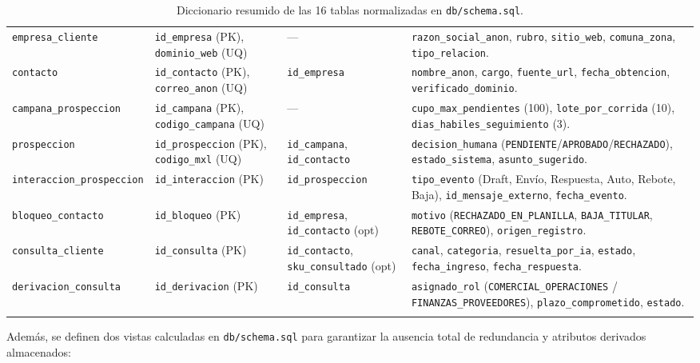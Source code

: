 \documentclass{article}
\begin{document}
\begin{longtable}{p{3.4cm}p{2.9cm}p{4.1cm}p{4.6cm}}
\texttt{empresa\_cliente} & \texttt{id\_empresa} (PK), \texttt{dominio\_web} (UQ) & --- & \texttt{razon\_social\_anon}, \texttt{rubro}, \texttt{sitio\_web}, \texttt{comuna\_zona}, \texttt{tipo\_relacion}. \\
\texttt{contacto} & \texttt{id\_contacto} (PK), \texttt{correo\_anon} (UQ) & \texttt{id\_empresa} & \texttt{nombre\_anon}, \texttt{cargo}, \texttt{fuente\_url}, \texttt{fecha\_obtencion}, \texttt{verificado\_dominio}. \\
\texttt{campana\_prospeccion} & \texttt{id\_campana} (PK), \texttt{codigo\_campana} (UQ) & --- & \texttt{cupo\_max\_pendientes} (100), \texttt{lote\_por\_corrida} (10), \texttt{dias\_habiles\_seguimiento} (3). \\
\texttt{prospeccion} & \texttt{id\_prospeccion} (PK), \texttt{codigo\_mxl} (UQ) & \texttt{id\_campana}, \texttt{id\_contacto} & \texttt{decision\_humana} (\texttt{PENDIENTE}/\texttt{APROBADO}/\texttt{RECHAZADO}), \texttt{estado\_sistema}, \texttt{asunto\_sugerido}. \\
\texttt{interaccion\_prospeccion} & \texttt{id\_interaccion} (PK) & \texttt{id\_prospeccion} & \texttt{tipo\_evento} (Draft, Envío, Respuesta, Auto, Rebote, Baja), \texttt{id\_mensaje\_externo}, \texttt{fecha\_evento}. \\
\texttt{bloqueo\_contacto} & \texttt{id\_bloqueo} (PK) & \texttt{id\_empresa}, \texttt{id\_contacto} (opt) & \texttt{motivo} (\texttt{RECHAZADO\_EN\_PLANILLA}, \texttt{BAJA\_TITULAR}, \texttt{REBOTE\_CORREO}), \texttt{origen\_registro}. \\
\texttt{consulta\_cliente} & \texttt{id\_consulta} (PK) & \texttt{id\_contacto}, \texttt{sku\_consultado} (opt) & \texttt{canal}, \texttt{categoria}, \texttt{resuelta\_por\_ia}, \texttt{estado}, \texttt{fecha\_ingreso}, \texttt{fecha\_respuesta}. \\
\texttt{derivacion\_consulta} & \texttt{id\_derivacion} (PK) & \texttt{id\_consulta} & \texttt{asignado\_rol} (\texttt{COMERCIAL\_OPERACIONES} / \texttt{FINANZAS\_PROVEEDORES}), \texttt{plazo\_comprometido}, \texttt{estado}. \\
\bottomrule
\caption{Diccionario resumido de las 16 tablas normalizadas en \texttt{db/schema.sql}.}
\end{longtable}

Además, se definen dos vistas calculadas en \texttt{db/schema.sql} para garantizar la ausencia total de redundancia y atributos derivados almacenados:
\end{document}
